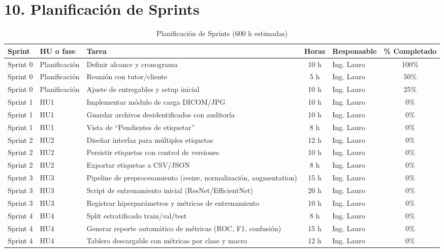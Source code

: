\documentclass[
11pt, %
]{charter}
\begin{document}
 

\section{10. Planificación de Sprints}


\begin{table}[htpb]
\centering
\caption{Planificación de Sprints (600 h estimadas)}
\begin{tabularx}{\linewidth}{@{}|l|l|X|c|l|c|@{}}
\hline
\rowcolor[HTML]{C0C0C0}
Sprint & HU o fase & Tarea & Horas & Responsable & \% Completado \\ \hline
Sprint 0 & Planificación & Definir alcance y cronograma & 10 h & Ing. Lauro & 100\% \\ \hline
Sprint 0 & Planificación & Reunión con tutor/cliente & 5 h & Ing. Lauro & 50\% \\ \hline
Sprint 0 & Planificación & Ajuste de entregables y setup inicial & 10 h & Ing. Lauro & 25\% \\ \hline
Sprint 1 & HU1 & Implementar módulo de carga DICOM/JPG & 10 h & Ing. Lauro & 0\% \\ \hline
Sprint 1 & HU1 & Guardar archivos desidentificados con auditoría & 10 h & Ing. Lauro & 0\% \\ \hline
Sprint 1 & HU1 & Vista de “Pendientes de etiquetar” & 8 h & Ing. Lauro & 0\% \\ \hline
Sprint 2 & HU2 & Diseñar interfaz para múltiples etiquetas & 12 h & Ing. Lauro & 0\% \\ \hline
Sprint 2 & HU2 & Persistir etiquetas con control de versiones & 10 h & Ing. Lauro & 0\% \\ \hline
Sprint 2 & HU2 & Exportar etiquetas a CSV/JSON & 8 h & Ing. Lauro & 0\% \\ \hline
Sprint 3 & HU3 & Pipeline de preprocesamiento (resize, normalización, augmentation) & 15 h & Ing. Lauro & 0\% \\ \hline
Sprint 3 & HU3 & Script de entrenamiento inicial (ResNet/EfficientNet) & 20 h & Ing. Lauro & 0\% \\ \hline
Sprint 3 & HU3 & Registrar hiperparámetros y métricas de entrenamiento & 10 h & Ing. Lauro & 0\% \\ \hline
Sprint 4 & HU4 & Split estratificado train/val/test & 8 h & Ing. Lauro & 0\% \\ \hline
Sprint 4 & HU4 & Generar reporte automático de métricas (ROC, F1, confusión) & 15 h & Ing. Lauro & 0\% \\ \hline
Sprint 4 & HU4 & Tablero descargable con métricas por clase y macro & 12 h & Ing. Lauro & 0\% \\ \hline
\end{tabularx}
\end{table}
\end{document}
